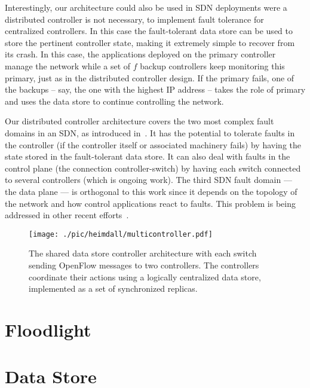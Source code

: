 Interestingly, our architecture could also be used in SDN deployments were a distributed controller is not necessary, to implement fault tolerance for centralized controllers.
In this case the fault-tolerant data store can be used to store the pertinent controller state, making it extremely simple to recover from its crash.
In this case, the applications deployed on the primary controller manage the network while a set of $f$ backup controllers keep monitoring this primary, just as in the distributed controller design.
If the primary fails, one of the backups -- say, the one with the highest IP address -- takes the role of primary and uses the data store to continue controlling the network.

Our distributed controller architecture covers the two most complex fault domains in an SDN, as introduced in~\cite{kim2012}.
It has the potential to tolerate faults in the controller (if the controller itself or associated machinery fails) by having the state stored in the fault-tolerant data store.
It can also deal with faults in the control plane (the connection controller-switch) by having each switch connected to several controllers (which is ongoing work).
The third SDN fault domain --- the data plane --- is orthogonal to this work since it depends on the topology of the network and how control applications react to faults.
This problem is being addressed in other recent efforts~\cite{kim2012,Reitblatt2013}.

\begin{figure}
\centering
\texttt{[image: ./pic/heimdall/multicontroller.pdf]}
\caption[Heimdall Architecture]{The shared data store controller
  architecture with each switch sending OpenFlow messages to two
  controllers. The controllers coordinate their actions using a
  logically centralized data store, implemented as a set of
  synchronized replicas. }
\label{fig:architecture} 
\end{figure}

\section{Floodlight} 
\glsresetall
\label{sec:heimdall:floodlight}


\section{Data Store}
\glsresetall
\label{sec:heimdall:dataStore}

